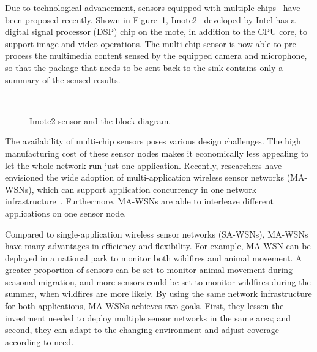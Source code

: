 Due to technological advancement, sensors equipped with multiple chips~\cite{imote2} have been proposed recently. Shown 
in Figure~\ref{fig:imote2}, Imote2~\cite{imote2} developed by Intel has a digital signal processor (DSP) chip on the 
mote, in addition to the CPU core, to support image and video operations. The multi-chip sensor is now able to 
pre-process the multimedia content sensed by the equipped camera and microphone, so that the package that needs to be 
sent back to the sink contains only a summary of the sensed results.

\begin{figure}[h]
\centering
\mbox{
	\hspace{20mm}
      }
\caption{Imote2 sensor and the block diagram.}
\label{fig:imote2}
\end{figure}

The availability of multi-chip sensors poses various design challenges. The high manufacturing cost of these sensor 
nodes makes it economically less appealing to let the whole network run just one application. Recently, researchers 
have envisioned the wide adoption of multi-application wireless sensor networks (MA-WSNs), which can support 
application concurrency in one network infrastructure~\cite{melete,ma-wsns}. Furthermore, MA-WSNs are able to 
interleave different applications on one sensor node.

Compared to single-application wireless sensor networks (SA-WSNs), MA-WSNs have many advantages in efficiency and 
flexibility.
For example, MA-WSN can be deployed in a national park to monitor both wildfires and animal movement. A greater 
proportion of sensors can be set to monitor animal movement during seasonal migration, and more sensors could be set to 
monitor wildfires during the summer, when wildfires are more likely. By using the same network infrastructure for both 
applications, MA-WSNs achieves two goals. First, they lessen the investment needed to deploy multiple sensor networks 
in the same area; and second, they can adapt to the changing environment and adjust coverage according to need.

